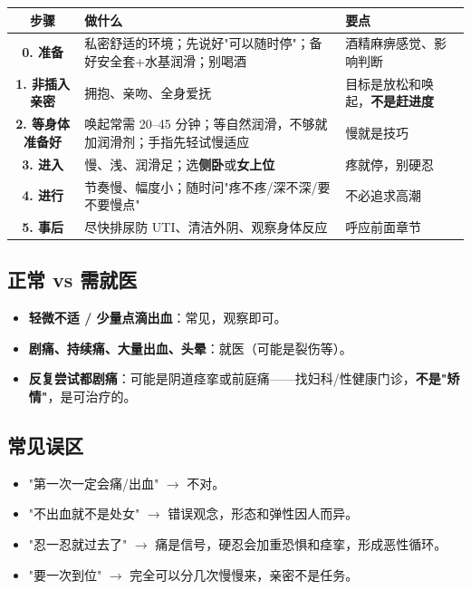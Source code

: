 \documentclass[12pt,UTF8,openany]{ctexbook}
\begin{document}
\begin{tabularx}{\linewidth}{C X X}
\toprule
\textbf{步骤} & \textbf{做什么} & \textbf{要点} \\
\midrule
\textbf{0. 准备} & 私密舒适的环境；先说好"可以随时停"；备好安全套+水基润滑；别喝酒 & 酒精麻痹感觉、影响判断 \\
\textbf{1. 非插入亲密} & 拥抱、亲吻、全身爱抚 & 目标是放松和唤起，\textbf{不是赶进度} \\
\textbf{2. 等身体准备好} & 唤起常需 20--45 分钟；等自然润滑，不够就加润滑剂；手指先轻试慢适应 & 慢就是技巧 \\
\textbf{3. 进入} & 慢、浅、润滑足；选\textbf{侧卧}或\textbf{女上位} & 疼就停，别硬忍 \\
\textbf{4. 进行} & 节奏慢、幅度小；随时问"疼不疼/深不深/要不要慢点" & 不必追求高潮 \\
\textbf{5. 事后} & 尽快排尿防 UTI、清洁外阴、观察身体反应 & 呼应前面章节 \\
\bottomrule
\end{tabularx}

\subsection{正常 vs 需就医}

\begin{itemize}[leftmargin=2em,itemsep=0.3em]
  \item \textbf{轻微不适 / 少量点滴出血}：常见，观察即可。
  \item \textbf{剧痛、持续痛、大量出血、头晕}：就医（可能是裂伤等）。
  \item \textbf{反复尝试都剧痛}：可能是阴道痉挛或前庭痛——找妇科/性健康门诊，\textbf{不是"矫情"}，是可治疗的。
\end{itemize}

\subsection{常见误区}

\begin{itemize}[leftmargin=2em,itemsep=0.3em]
  \item "第一次一定会痛/出血" $\rightarrow$ 不对。
  \item "不出血就不是处女" $\rightarrow$ 错误观念，形态和弹性因人而异。
  \item "忍一忍就过去了" $\rightarrow$ 痛是信号，硬忍会加重恐惧和痉挛，形成恶性循环。
  \item "要一次到位" $\rightarrow$ 完全可以分几次慢慢来，亲密不是任务。
\end{itemize}
\end{document}
